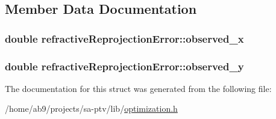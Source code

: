 \subsection{Member Data Documentation}
\hypertarget{structrefractiveReprojectionError_a7992f6f0be264e8a5f72027ac5897581}{
\subsubsection[{observed\-\_\-x}]{\setlength{\rightskip}{0pt plus 5cm}double refractive\-Reprojection\-Error\-::observed\-\_\-x}}\label{d8/d20/structrefractiveReprojectionError_a7992f6f0be264e8a5f72027ac5897581}
\hypertarget{structrefractiveReprojectionError_aa2f04966bc8045945bee5487a0b6fac7}{
\subsubsection[{observed\-\_\-y}]{\setlength{\rightskip}{0pt plus 5cm}double refractive\-Reprojection\-Error\-::observed\-\_\-y}}\label{d8/d20/structrefractiveReprojectionError_aa2f04966bc8045945bee5487a0b6fac7}


The documentation for this struct was generated from the following file\-:\begin{DoxyCompactItemize}
\item 
/home/ab9/projects/sa-\/ptv/lib/\hyperlink{optimization_8h}{optimization.\-h}\end{DoxyCompactItemize}
